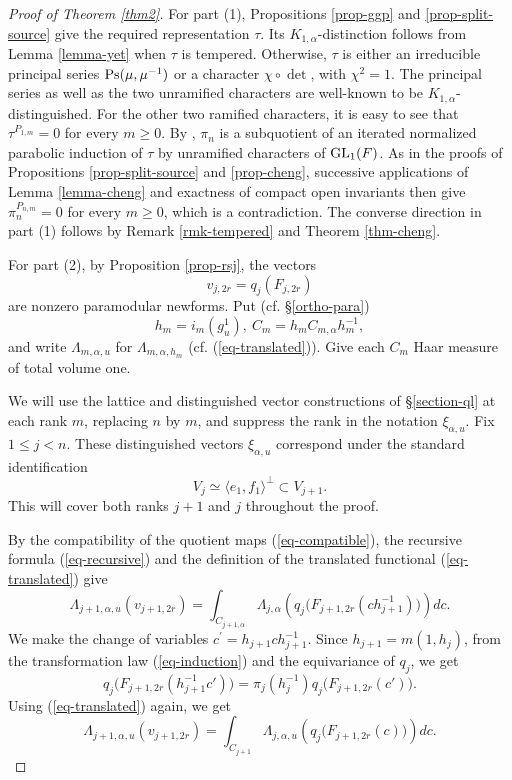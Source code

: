 \documentclass[12pt]{amsart}
\theoremstyle{definition}
\theoremstyle{remark}
\begin{document}
\begin{proof}[Proof of Theorem \ref{thm2}]
For part (1), Propositions \ref{prop-ggp} and \ref{prop-split-source} give the required representation
$\tau$. Its $K_{1,\alpha}$-distinction follows from
Lemma \ref{lemma-yet} when $\tau$ is tempered. Otherwise, $\tau$ is either an irreducible principal
series ${\rm Ps}(\mu,\mu^{-1})$ or a character $\chi\circ\det$, with $\chi^2=1$. The principal series as
well as the two unramified characters are well-known to be $K_{1,\alpha}$-distinguished. For the
other two ramified characters, it is easy to see that $\tau^{P_{1,m}}=0$ for every $m\geq0$. By \cite[Chapter III, §4, Proposition 4.1(iii)]{kud96}, $\pi_n$ is a subquotient of an
iterated normalized parabolic induction of $\tau$ by unramified characters of ${\rm GL}_1(F)$.
As in the proofs of Propositions \ref{prop-split-source} and \ref{prop-cheng}, successive applications
of Lemma \ref{lemma-cheng} and exactness of compact open invariants then give $\pi_n^{P_{n,m}}
=0$ for every $m\geq0$, which is a contradiction. The converse direction in part (1) follows by Remark \ref{rmk-tempered} and Theorem \ref{thm-cheng}.

For part (2), by Proposition \ref{prop-rsj}, the vectors
\[
v_{j,2r}=q_j(F_{j,2r})
\]
are nonzero paramodular newforms. Put (cf. \S \ref{ortho-para})
\[
h_m=i_m(g_u^1),
~
C_m=h_mC_{m,\alpha}h_m^{-1},
\]
and write $\Lambda_{m,\alpha,u}$ for $\Lambda_{m,\alpha,h_m}$ (cf. (\ref{eq-translated})). Give each $C_m$ Haar measure of total volume one.

We will use the lattice and distinguished vector constructions of \S \ref{section-ql} at each rank $m$, replacing $n$ by $m$, and suppress the rank in the notation $\xi_{\alpha,u}$. Fix $1\leq j <n$. These distinguished vectors $\xi_{\alpha,u}$ correspond under the standard identification
\[
V_j\simeq\langle e_1,f_1\rangle^\perp\subset V_{j+1}.
\]
This will cover both ranks $j+1$ and $j$ throughout the proof.

By the compatibility of the quotient maps (\ref{eq-compatible}), the recursive formula (\ref{eq-recursive}) and the definition of the translated functional (\ref{eq-translated}) give
\[
\Lambda_{j+1,\alpha,u}(v_{j+1,2r})
=
\int_{C_{j+1,\alpha}}
\Lambda_{j,\alpha}\!\left(
q_j\bigl(F_{j+1,2r}(c h_{j+1}^{-1})\bigr)
\right)dc.
\]
We make the change of variables $c^\prime = h_{j+1}ch_{j+1}^{-1}$. Since $h_{j+1}=m(1,h_j)$, from the transformation law (\ref{eq-induction}) and the equivariance of $q_j$, we get 
\[
q_j\bigl(F_{j+1,2r}(h_{j+1}^{-1}c')\bigr)
=
\pi_j(h_j^{-1})
q_j\bigl(F_{j+1,2r}(c')\bigr).
\]
Using (\ref{eq-translated}) again, we get
\[
\Lambda_{j+1,\alpha,u}(v_{j+1,2r})
=
\int_{C_{j+1}}
\Lambda_{j,\alpha,u}\!\left(
q_j\bigl(F_{j+1,2r}(c)\bigr)
\right)dc.
\]


\end{proof}
\end{document}
